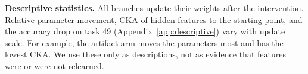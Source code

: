 \textbf{Descriptive statistics.} All branches update their weights after the intervention. Relative
parameter movement, CKA of hidden features to the starting point, and the accuracy drop on task 49
(Appendix~\ref{app:descriptive}) vary with update scale. For example, the artifact arm moves the
parameters most and has the lowest CKA. We use these only as descriptions, not as evidence that features
were or were not relearned.
